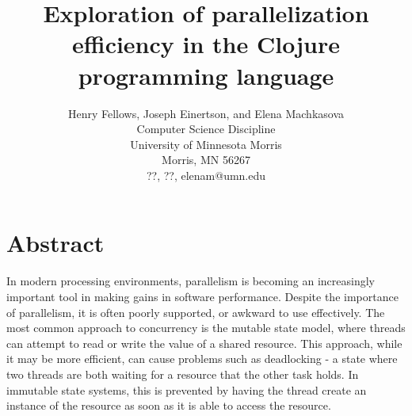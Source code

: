 \documentclass[12pt]{article}
\newcommand{\comment}[1]{{\bf \tt  {#1}}}
\begin{document}
\pagestyle{plain}
%

\title{Exploration of parallelization efficiency in the Clojure programming language}
%
%

\author{
Henry Fellows, Joseph Einertson, and Elena Machkasova \\
Computer Science Discipline \\
University of Minnesota Morris\\
Morris, MN 56267\\
??, ??, elenam@umn.edu
}

\date{}

\maketitle
\thispagestyle{empty}

\section*{\centering Abstract}
In modern processing environments, parallelism is becoming an increasingly important tool in making gains in software performance. Despite the importance of parallelism, it is often poorly supported, or awkward to use effectively. The most common approach to concurrency is the mutable state model, where threads can attempt to read or write the value of a shared resource. This approach, while it may be more efficient, can cause problems such as deadlocking - a state where two threads are both waiting for a resource that the other task holds. In immutable state systems, this is prevented by having the thread create an instance of the resource as soon as it is able to access the resource.
\end{document}

